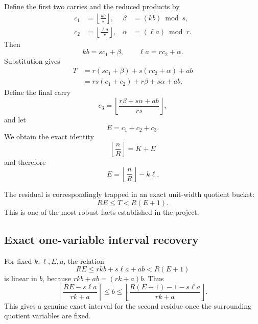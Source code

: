 \documentclass[11pt,a4paper]{article}
\begin{document}
Define the first two carries and the reduced products by
\begin{align}
    c_1 &= \left\lfloor \frac{kb}{s}\right\rfloor,
    &\beta&=(kb)\bmod s,\\
    c_2 &= \left\lfloor \frac{\ell a}{r}\right\rfloor,
    &\alpha&=(\ell a)\bmod r.
\end{align}
Then
\begin{equation}
    kb=sc_1+\beta,
    \qquad
    \ell a=rc_2+\alpha.
\end{equation}
Substitution gives
\begin{align}
    T
      &= r(sc_1+\beta)+s(rc_2+\alpha)+ab\\
      &= rs(c_1+c_2)+r\beta+s\alpha+ab.
\end{align}
Define the final carry
\begin{equation}
    c_3=
    \left\lfloor
    \frac{r\beta+s\alpha+ab}{rs}
    \right\rfloor,
\end{equation}
and let
\begin{equation}
    E=c_1+c_2+c_3.
\end{equation}
We obtain the exact identity
\begin{equation}
    \boxed{
    \left\lfloor\frac{n}{R}\right\rfloor=K+E
    }
\end{equation}
and therefore
\begin{equation}
    \boxed{
    E=\left\lfloor\frac{n}{R}\right\rfloor-k\ell.
    }
\end{equation}

The residual is correspondingly trapped in an exact unit-width quotient bucket:
\begin{equation}
    \boxed{
    RE\le T<R(E+1).
    }
\end{equation}
This is one of the most robust facts established in the project.

\subsection{Exact one-variable interval recovery}
For fixed \(k,\ell,E,a\), the relation
\[
RE\le rkb+s\ell a+ab<R(E+1)
\]
is linear in \(b\), because \(rkb+ab=(rk+a)b\). Thus
\begin{equation}
\left\lceil
\frac{RE-s\ell a}{rk+a}
\right\rceil
\le b\le
\left\lfloor
\frac{R(E+1)-1-s\ell a}{rk+a}
\right\rfloor.
\end{equation}
This gives a genuine exact interval for the second residue once the surrounding quotient variables are fixed.
\end{document}

